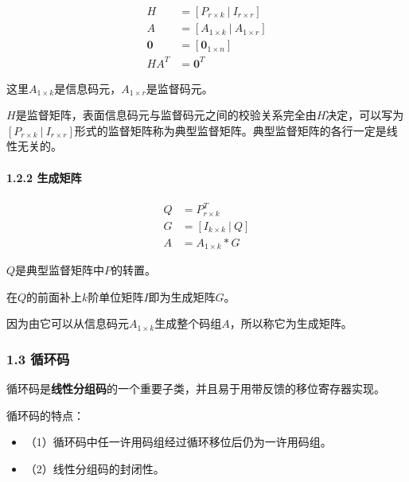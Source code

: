 \documentclass[
]{article}
\begin{document}
\begin{equation}
\begin{aligned}
H &= [P_{r \times k} \: | \: I_{r \times r}]\\
A &= [A_{1 \times k} \: | \: A_{1 \times r}]\\
\boldsymbol0 &= [\boldsymbol0_{1 \times n}]\\
HA^T &= \boldsymbol0^T 
\end{aligned}
\end{equation}

这里$A_{1 \times k}$是信息码元，$A_{1 \times r}$是监督码元。

$H$是监督矩阵，表面信息码元与监督码元之间的校验关系完全由$H$决定，可以写为$[P_{r \times k} \: | \: I_{r \times r}]$形式的监督矩阵称为典型监督矩阵。典型监督矩阵的各行一定是线性无关的。

\hypertarget{header-n20}{%
\paragraph{1.2.2 生成矩阵}\label{header-n20}}

\begin{equation}
\begin{aligned}
Q &= P_{r \times k}^T\\
G &= [I_{k \times k} \: | \: Q]\\
A &= A_{1 \times k}*G
\end{aligned}
\end{equation}

$Q$是典型监督矩阵中$P$的转置。

在$Q$的前面补上$k$阶单位矩阵$I$即为生成矩阵$G$。

因为由它可以从信息码元$A_{1 \times k}$生成整个码组$A$，所以称它为生成矩阵。

\hypertarget{header-n25}{%
\subsubsection{1.3 循环码}\label{header-n25}}

循环码是\textbf{线性分组码}的一个重要子类，并且易于用带反馈的移位寄存器实现。

循环码的特点：

\begin{itemize}
\item
  （1）循环码中任一许用码组经过循环移位后仍为一许用码组。
\item
  （2）线性分组码的封闭性。
\end{itemize}
\end{document}

